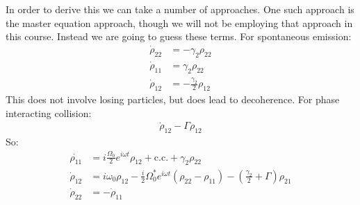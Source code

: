 In order to derive this we can take a number of approaches. One such approach is the master equation approach, though we will not be employing that approach in this course. Instead we are going to guess these terms. For spontaneous emission:
\begin{align*}
	\dot{\rho}_{22} &= -\gamma_2 \rho_{22} \\
	\dot{\rho}_{11} &= \gamma_2 \rho_{22} \\
	\dot{\rho}_{12} &= -\frac{\gamma_2}{2}\rho_{12}
\end{align*}
This does not involve losing particles, but does lead to decoherence. For phase interacting collision:
\begin{align*}
	\dot{\rho}_{12} - \Gamma\rho_{12}
\end{align*}
So:
\begin{align*}
	\dot{\rho_{11}} &= i\frac{\Omega_0}{2} e^{i\omega t} \rho_{12} + \text{c.c.} + \gamma_2\rho_{22} \\
	\dot{\rho}_{12} &= i\omega_0 \rho_{12} - \frac{i}{2}\Omega_0^* e^{i\omega t} (\rho_{22} - \rho_{11}) -\left(\frac{\gamma_2}{2} + \Gamma\right)\rho_{21} \\
	\dot{\rho}_{22} &= -\dot{\rho}_{11}
\end{align*}
